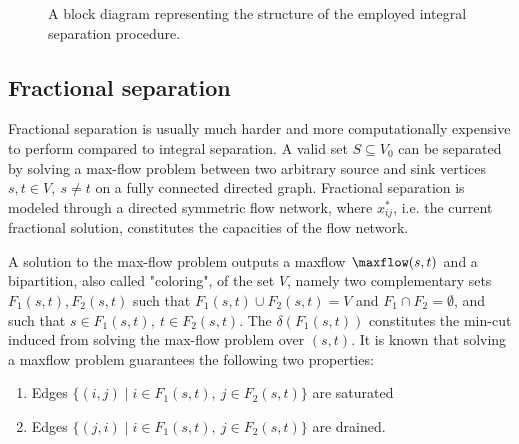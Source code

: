 \begin{figure}[ht]
	\centering
	\caption{A block diagram representing the structure of the employed integral separation procedure.}
	\label{fig:integral-separation-block-diagram}
\end{figure}




\subsection{Fractional separation}\label{sec:fractional-separation}
Fractional separation is usually much harder and more computationally expensive to perform compared to integral separation.
A valid set $S \subseteq V_0$ can be separated by solving a max-flow problem between two arbitrary source and sink vertices $s, t \in V,\ s \ne t$ on a fully connected directed graph.
Fractional separation is modeled through a directed symmetric flow network, where $x^*_{ij}$, i.e. the current fractional solution, constitutes the capacities of the flow network.


A solution to the max-flow problem outputs a maxflow $\maxflow(s, t)$ and a bipartition, also called "coloring", of the set $V$, namely two complementary sets $F_1(s, t), F_2(s, t)$ such that $F_1(s, t) \cup F_2(s, t) = V$ and $F_1 \cap F_2 = \emptyset$, and such that $s \in F_1(s, t),\ t \in F_2(s, t)$.
The $\delta(F_1(s, t))$ constitutes the min-cut induced from solving the max-flow problem over $(s, t)$.
It is known that solving a maxflow problem guarantees the following two properties:

\begin{enumerate}
	\item Edges $\{ (i, j) \mid i \in F_1(s, t),\ j \in F_2(s, t) \}$ are saturated
	\item Edges $\{ (j, i) \mid i \in F_1(s, t),\ j \in F_2(s, t) \}$ are drained.
\end{enumerate}

